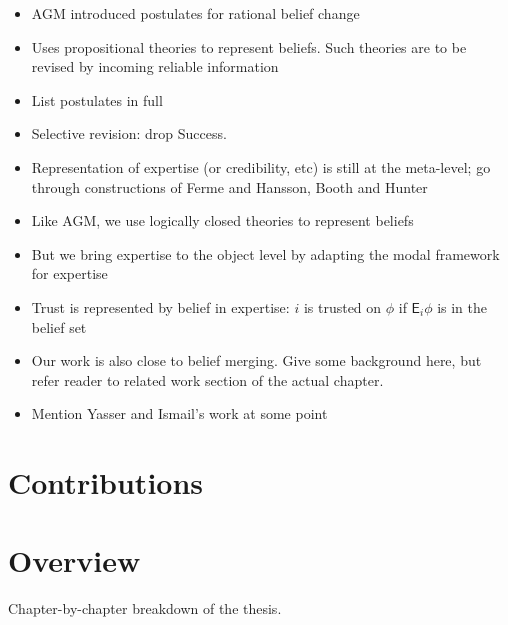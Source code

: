 \begin{notes}
    \begin{itemize}
        \item AGM introduced postulates for rational belief change
        \item Uses propositional theories to represent beliefs. Such theories
              are to be revised by incoming reliable information
        \item List postulates in full
        \item Selective revision: drop Success.
        \item Representation of expertise (or credibility, etc) is still at the
              meta-level; go through constructions of Ferme and Hansson, Booth
              and Hunter
        \item Like AGM, we use logically closed theories to represent beliefs
        \item But we bring expertise to the object level by adapting the modal
              framework for expertise
        \item Trust is represented by belief in expertise: $i$ is trusted on
            $\phi$ if $\mathsf{E}_i\phi$ is in the belief set
        \item Our work is also close to belief merging. Give some background
              here, but refer reader to related work section of the actual
              chapter.
        \item Mention Yasser and Ismail's work at some point
    \end{itemize}
\end{notes}

\section{Contributions}


\section{Overview}

\begin{notes}
    Chapter-by-chapter breakdown of the thesis.
\end{notes}
